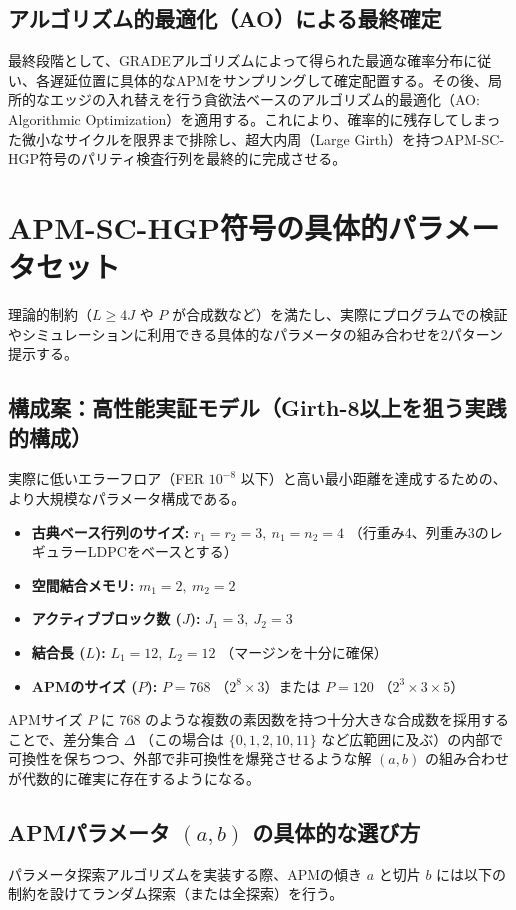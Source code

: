 \documentclass[12pt]{article}
\begin{document}
\subsection{アルゴリズム的最適化（AO）による最終確定}
最終段階として、GRADEアルゴリズムによって得られた最適な確率分布に従い、各遅延位置に具体的なAPMをサンプリングして確定配置する。その後、局所的なエッジの入れ替えを行う貪欲法ベースのアルゴリズム的最適化（AO: Algorithmic Optimization）を適用する。これにより、確率的に残存してしまった微小なサイクルを限界まで排除し、超大内周（Large Girth）を持つAPM-SC-HGP符号のパリティ検査行列を最終的に完成させる。

\section{APM-SC-HGP符号の具体的パラメータセット}

理論的制約（$L \ge 4J$ や $P$ が合成数など）を満たし、実際にプログラムでの検証やシミュレーションに利用できる具体的なパラメータの組み合わせを2パターン提示する。

\subsection{構成案：高性能実証モデル（Girth-8以上を狙う実践的構成）}
実際に低いエラーフロア（FER $10^{-8}$ 以下）と高い最小距離を達成するための、より大規模なパラメータ構成である。

\begin{itemize}
    \item \textbf{古典ベース行列のサイズ:} $r_1=r_2=3, \ n_1=n_2=4$ （行重み4、列重み3のレギュラーLDPCをベースとする）
    \item \textbf{空間結合メモリ:} $m_1=2, \ m_2=2$
    \item \textbf{アクティブブロック数 ($J$):} $J_1=3, \ J_2=3$
    \item \textbf{結合長 ($L$):} $L_1=12, \ L_2=12$ （マージンを十分に確保）
    \item \textbf{APMのサイズ ($P$):} $P=768$ （$2^8 \times 3$）または $P=120$ （$2^3 \times 3 \times 5$）
\end{itemize}

APMサイズ $P$ に $768$ のような複数の素因数を持つ十分大きな合成数を採用することで、差分集合 $\Delta$ （この場合は $\{0, 1, 2, 10, 11\}$ など広範囲に及ぶ）の内部で可換性を保ちつつ、外部で非可換性を爆発させるような解 $(a,b)$ の組み合わせが代数的に確実に存在するようになる。

\subsection{APMパラメータ $(a, b)$ の具体的な選び方}
パラメータ探索アルゴリズムを実装する際、APMの傾き $a$ と切片 $b$ には以下の制約を設けてランダム探索（または全探索）を行う。
\end{document}

